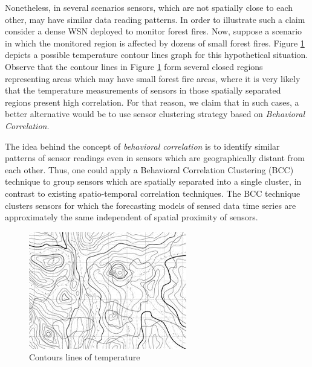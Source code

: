 \documentclass[conference]{IEEEtran}
\begin{document}
Nonetheless, in several scenarios sensors, which are not spatially close to each
other, may have similar data reading patterns. In order to illustrate such a
claim consider a dense WSN deployed to monitor forest fires. 
Now, suppose a scenario in which the monitored region is affected by dozens of
small forest fires. Figure \ref{contour_lines} depicts a possible temperature
contour lines graph for this hypothetical situation. Observe that the contour
lines in Figure \ref{contour_lines} form several closed regions representing
areas which may have small forest fire areas, where it is very likely that the
temperature measurements of sensors in those spatially separated regions present
high correlation. For that reason, we claim that in such cases, a better
alternative would be to use sensor clustering strategy based on
\textit{Behavioral Correlation}.

The idea behind the concept of {\it behavioral correlation} is to identify
similar patterns of sensor readings even in sensors which are geographically
distant from each other. Thus, one could apply a Behavioral Correlation
Clustering (BCC) technique to group sensors which are spatially separated into a
single cluster, in contrast to existing spatio-temporal correlation techniques.
The BCC technique clusters sensors for which the forecasting models of sensed
data time series are approximately the same independent of spatial proximity of
sensors.




\begin{figure}[!htb]
\centering
	\includegraphics[scale=0.7]{I2.png}
    \caption{Contours lines of temperature}
    \label{contour_lines}
\end{figure}
\end{document}
